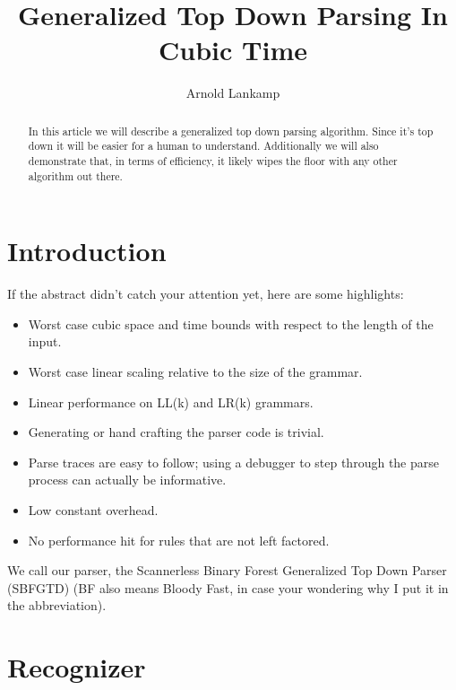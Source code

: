 \documentclass[a4paper,10pt]{article}
\title{Generalized Top Down Parsing In Cubic Time}
\author{Arnold Lankamp}
\begin{document}
\maketitle

\begin{abstract}

In this article we will describe a generalized top down parsing algorithm. Since it's top down it will be easier for a human to understand. Additionally we will also demonstrate that, in terms of efficiency, it likely wipes the floor with any other algorithm out there.

\end{abstract}

\section{Introduction}

If the abstract didn't catch your attention yet, here are some highlights:
\begin{itemize}
 \setlength{\itemsep}{1pt}
 \setlength{\parskip}{0pt}
 \setlength{\parsep}{0pt}
 \item Worst case cubic space and time bounds with respect to the length of the input.
 \item Worst case linear scaling relative to the size of the grammar.
 \item Linear performance on LL(k) and LR(k) grammars.
 \item Generating or hand crafting the parser code is trivial.
 \item Parse traces are easy to follow; using a debugger to step through the parse process can actually be informative.
 \item Low constant overhead.
 \item No performance hit for rules that are not left factored.
\end{itemize}
We call our parser, the Scannerless Binary Forest Generalized Top Down Parser (SBFGTD) (BF also means Bloody Fast, in case your wondering why I put it in the abbreviation).

\section{Recognizer}
\end{document}
